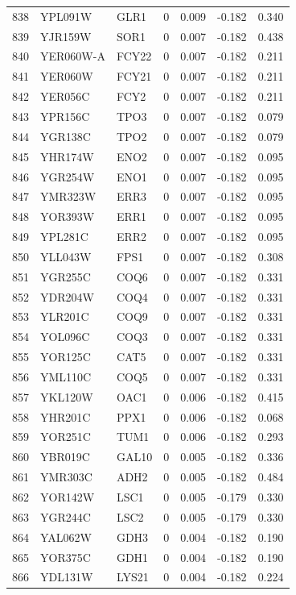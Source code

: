 \begin{longtable}{rllrrrr}
838 & YPL091W & GLR1 & 0 & 0.009 & -0.182 & 0.340\\
839 & YJR159W & SOR1 & 0 & 0.007 & -0.182 & 0.438\\
840 & YER060W-A & FCY22 & 0 & 0.007 & -0.182 & 0.211\\
841 & YER060W & FCY21 & 0 & 0.007 & -0.182 & 0.211\\
842 & YER056C & FCY2 & 0 & 0.007 & -0.182 & 0.211\\
843 & YPR156C & TPO3 & 0 & 0.007 & -0.182 & 0.079\\
844 & YGR138C & TPO2 & 0 & 0.007 & -0.182 & 0.079\\
845 & YHR174W & ENO2 & 0 & 0.007 & -0.182 & 0.095\\
846 & YGR254W & ENO1 & 0 & 0.007 & -0.182 & 0.095\\
847 & YMR323W & ERR3 & 0 & 0.007 & -0.182 & 0.095\\
848 & YOR393W & ERR1 & 0 & 0.007 & -0.182 & 0.095\\
849 & YPL281C & ERR2 & 0 & 0.007 & -0.182 & 0.095\\
850 & YLL043W & FPS1 & 0 & 0.007 & -0.182 & 0.308\\
851 & YGR255C & COQ6 & 0 & 0.007 & -0.182 & 0.331\\
852 & YDR204W & COQ4 & 0 & 0.007 & -0.182 & 0.331\\
853 & YLR201C & COQ9 & 0 & 0.007 & -0.182 & 0.331\\
854 & YOL096C & COQ3 & 0 & 0.007 & -0.182 & 0.331\\
855 & YOR125C & CAT5 & 0 & 0.007 & -0.182 & 0.331\\
856 & YML110C & COQ5 & 0 & 0.007 & -0.182 & 0.331\\
857 & YKL120W & OAC1 & 0 & 0.006 & -0.182 & 0.415\\
858 & YHR201C & PPX1 & 0 & 0.006 & -0.182 & 0.068\\
859 & YOR251C & TUM1 & 0 & 0.006 & -0.182 & 0.293\\
860 & YBR019C & GAL10 & 0 & 0.005 & -0.182 & 0.336\\
861 & YMR303C & ADH2 & 0 & 0.005 & -0.182 & 0.484\\
862 & YOR142W & LSC1 & 0 & 0.005 & -0.179 & 0.330\\
863 & YGR244C & LSC2 & 0 & 0.005 & -0.179 & 0.330\\
864 & YAL062W & GDH3 & 0 & 0.004 & -0.182 & 0.190\\
865 & YOR375C & GDH1 & 0 & 0.004 & -0.182 & 0.190\\
866 & YDL131W & LYS21 & 0 & 0.004 & -0.182 & 0.224\\

\end{longtable}
